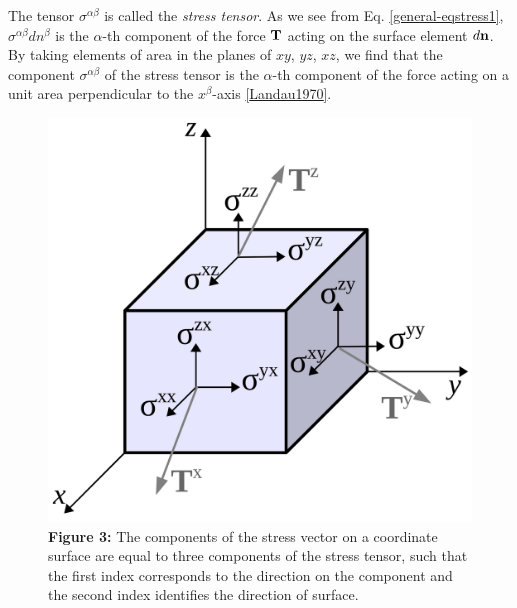 \documentclass[letterpaper,10pt,english]{sphinxmanual}
\begin{document}
The tensor $\sigma^{\alpha\beta}$ is called the \emph{stress tensor}. As we see from Eq. \eqref{general-eqstress1}, $\sigma^{\alpha\beta}dn^{\beta}$ is the $\alpha$-th component of the force ${\bf T}$ acting on the surface element $d{\bf n}$. By taking elements of area in the planes of $xy$, $yz$, $xz$, we find that the component $\sigma^{\alpha\beta}$ of the stress tensor is the $\alpha$-th component of the force acting on a unit area perpendicular to the $x^{\beta}$-axis {\hyperref[general:landau1970]{{[}Landau1970{]}}}.
\begin{figure}[htbp]
\centering
\capstart

\includegraphics{Fig3.png}
\caption{\textbf{Figure 3:} The components of the stress vector on a coordinate surface are equal to three components of the stress tensor, such that the first index corresponds to the direction on the component and the second index identifies the direction of surface.}\end{figure}
\end{document}
